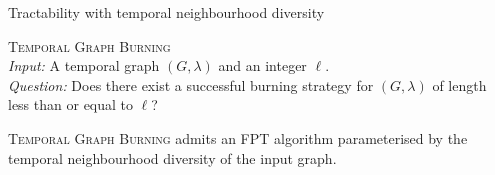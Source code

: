 \documentclass[10pt, compress]{beamer}
\begin{document}
\begin{frame}{Tractability with temporal neighbourhood diversity}

\textsc{Temporal Graph Burning}\\
\textit{Input:} A temporal graph $(G, \lambda)$ and an integer $\ell$.\\
\textit{Question:} Does there exist a  successful burning strategy for $(G, \lambda)$ of length less than or equal to $\ell$?

\vspace{1cm}

\begin{theorem}
\textsc{Temporal Graph Burning} admits an FPT algorithm parameterised by the temporal neighbourhood diversity of the input graph.
\end{theorem}



\end{frame}









\end{document}
